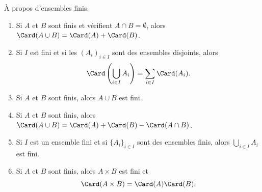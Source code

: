 \begin{proposition}	\label{PROPooOTHMooPzPzdW}
	À propos d'ensembles finis.
	\begin{enumerate}
		\item	\label{ITEMooBQDUooOoYhnI}
		      Si \( A\) et \( B\) sont finis et vérifient \( A\cap B=\emptyset\), alors \( \Card(A\cup B)=\Card(A)+\Card(B)\).
		\item		\label{ITEMooUCUFooBLByHz}
		      Si \( I\) est fini et si les \( (A_i)_{i\in I}\) sont des ensembles disjoints, alors
		      \begin{equation}
			      \Card\left( \bigcup_{i\in I}A_i \right)=\sum_{i\in I}\Card(A_i).
		      \end{equation}
		\item		\label{ITEMooSXBMooFgAvyJ}
		      Si \( A\) et \( B\) sont finis, alors \( A\cup B\) est fini.
		\item	\label{ITEMooKYXFooWukErM}
		      Si \( A\) et \( B\) sont finis, alors \( \Card(A\cup B)=\Card(A)+\Card(B)-\Card(A\cap B)\).
		\item		\label{ITEMooFIEUooRmDcfo}
		      Si \( I\) est un ensemble fini et si \( \{ A_i \}_{i\in I}\) sont des ensembles finis, alors \( \bigcup_{i\in I}A_i\) est fini.
		\item		\label{ITEMooLVSVooHEwNWA}
		      Si \( A\) et \( B\) sont finis, alors \( A\times B\) est fini et
		      \begin{equation}
			      \Card(A\times B)=\Card(A)\Card(B).
		      \end{equation}
	\end{enumerate}
\end{proposition}

